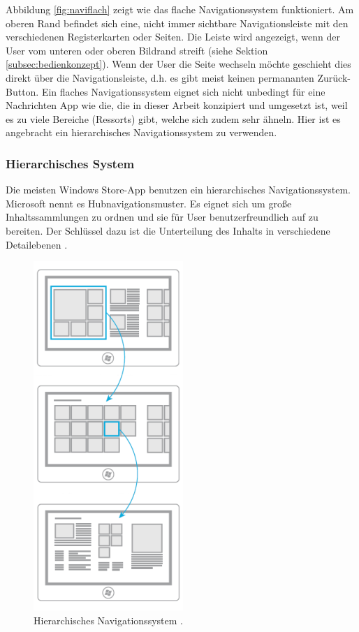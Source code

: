 \documentclass[12pt,a4paper]{scrartcl}
\begin{document}
Abbildung \ref{fig:naviflach} zeigt wie das flache Navigationssystem funktioniert. Am oberen Rand befindet sich eine, nicht immer sichtbare Navigationsleiste mit den verschiedenen Registerkarten oder Seiten. Die Leiste wird angezeigt, wenn der User vom unteren oder oberen Bildrand streift (siehe Sektion \ref{subsec:bedienkonzept}). Wenn der User die Seite wechseln möchte geschieht dies  direkt über die Navigationsleiste, d.h. es gibt meist keinen permananten Zurück-Button. Ein flaches Navigationssystem eignet sich nicht unbedingt für eine Nachrichten App wie die, die in dieser Arbeit konzipiert und umgesetzt ist, weil es zu viele Bereiche (Ressorts) gibt, welche sich zudem sehr ähneln. Hier ist es angebracht ein hierarchisches Navigationssystem zu verwenden.    



\subsubsection{Hierarchisches System}
\label{subsubsec:hierachischessystem}
Die meisten Windows Store-App benutzen ein hierarchisches Navigationssystem. Microsoft nennt es Hubnavigationsmuster. Es eignet sich um große Inhaltssammlungen zu ordnen und sie für User benutzerfreundlich auf zu bereiten. Der Schlüssel dazu ist die Unterteilung des Inhalts in verschiedene Detailebenen \citep{MicrosoftNavidesign2013}.

\begin{figure}[h]	
	\centering
	\includegraphics[scale=1]{Bilder/Abbildungen/ms_navigation_hierarchie} 
	\caption{Hierarchisches Navigationssystem \protect\citep{MicrosoftNavidesign2013}.}
	\label{fig:navihierarchisch}
\end{figure}
\end{document}
